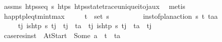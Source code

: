 \begin{isabellebody}
\ assms\ {\isacartoucheopen}htps{\isacharunderscore}{\kern0pt}seq\ {\isasympi}s\ htps{\isacartoucheclose}\ htps{\isacharunderscore}{\kern0pt}state{\isacharunderscore}{\kern0pt}trace{\isacharunderscore}{\kern0pt}unique{\isacharunderscore}{\kern0pt}i{\isacharunderscore}{\kern0pt}to{\isacharunderscore}{\kern0pt}j{\isacharunderscore}{\kern0pt}aux\ \isamarkupfalse%
\ metis\isanewline
\ \ \isamarkupfalse%
%
\endisatagproof
{\isafoldproof}%
%
\isadelimproof
\isanewline
%
\endisadelimproof
\isanewline
\ \ \isamarkupfalse%
\ happ{\isacharunderscore}{\kern0pt}tp{\isacharunderscore}{\kern0pt}leq{\isacharunderscore}{\kern0pt}t\isactrlsub m\isactrlsub i\isactrlsub n{\isacharunderscore}{\kern0pt}t\isactrlsub m\isactrlsub a\isactrlsub x{\isacharcolon}{\kern0pt}\isanewline
\ \ \ \ \ {\isachardoublequoteopen}{\isacharparenleft}{\kern0pt}t\isactrlsub {\isasympi}{\isacharcomma}{\kern0pt}{\isasympi}{\isacharparenright}{\kern0pt}\ {\isasymin}\ set\ {\isasympi}s{\isachardoublequoteclose}\isanewline
\ \ \ \ \ \ \ \ \ {\isachardoublequoteopen}inst{\isacharunderscore}{\kern0pt}of{\isacharunderscore}{\kern0pt}plan{\isacharunderscore}{\kern0pt}action\ {\isasympi}s\ {\isacharparenleft}{\kern0pt}t\isactrlsub {\isasympi}{\isacharcomma}{\kern0pt}{\isasympi}{\isacharparenright}{\kern0pt}\ {\isacharparenleft}{\kern0pt}t\isactrlsub a{\isacharcomma}{\kern0pt}a{\isacharparenright}{\kern0pt}{\isachardoublequoteclose}\ \isanewline
\ \ \ \ \ {\isachardoublequoteopen}{\isacharparenleft}{\kern0pt}{\isasymexists}t\isactrlsub j{\isachardot}{\kern0pt}\ is{\isacharunderscore}{\kern0pt}htp\ {\isasympi}s\ t\isactrlsub j\ {\isasymand}\ t\isactrlsub j\ {\isasymle}\ t\isactrlsub a{\isacharparenright}{\kern0pt}\ {\isasymand}\ {\isacharparenleft}{\kern0pt}{\isasymexists}t\isactrlsub j{\isachardot}{\kern0pt}\ is{\isacharunderscore}{\kern0pt}htp\ {\isasympi}s\ t\isactrlsub j\ {\isasymand}\ t\isactrlsub a\ {\isasymle}\ t\isactrlsub j{\isacharparenright}{\kern0pt}{\isachardoublequoteclose}\isanewline
%
\isadelimproof
\ \ %
\endisadelimproof
%
\isatagproof
{}\isamarkupfalse%
\ {\isacharminus}{\kern0pt}\isanewline
\ \ \ \ \isamarkupfalse%
\ {\isacharquery}{\kern0pt}case{}{\isacharequal}{\kern0pt}{\isachardoublequoteopen}res{\isacharunderscore}{\kern0pt}inst\ {\isasympi}\ At{\isacharunderscore}{\kern0pt}Start\ {\isacharequal}{\kern0pt}\ Some\ a\ {\isasymand}\ t\isactrlsub {\isasympi}\ {\isacharequal}{\kern0pt}\ t\isactrlsub a{\isachardoublequoteclose}\isanewline

\end{isabellebody}

